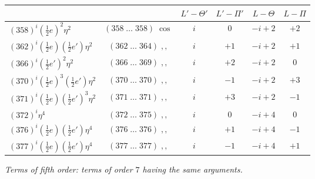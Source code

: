 \documentclass[11pt]{article}
\begin{document}
\begin{center}
\begin{tabular}{|l|c|c|c|c|c|}
\hline
 & & $L'-\Theta'$ & $L'-\Pi'$ & $L-\Theta$ & $L-\Pi$ \\
\hline
$(358)^i(\tfrac{1}{2}e)^2\eta^2$ & $(358\;\ldots\;358)\;\cos$ & $i$ & $0$ & $-i+2$ & $+2$ \\
$(362)^i(\tfrac{1}{2}e)(\tfrac{1}{2}e')\eta^2$ & $(362\;\ldots\;364)\;,,$ & $i$ & $+1$ & $-i+2$ & $+1$ \\
$(366)^i(\tfrac{1}{2}e')^2\eta^2$ & $(366\;\ldots\;369)\;,,$ & $i$ & $+2$ & $-i+2$ & $0$ \\
$(370)^i(\tfrac{1}{2}e)^3(\tfrac{1}{2}e')\eta^2$ & $(370\;\ldots\;370)\;,,$ & $i$ & $-1$ & $-i+2$ & $+3$ \\
$(371)^i(\tfrac{1}{2}e)(\tfrac{1}{2}e')^3\eta^2$ & $(371\;\ldots\;371)\;,,$ & $i$ & $+3$ & $-i+2$ & $-1$ \\
$(372)^i\eta^4$ & $(372\;\ldots\;375)\;,,$ & $i$ & $0$ & $-i+4$ & $0$ \\
$(376)^i(\tfrac{1}{2}e)(\tfrac{1}{2}e')\eta^4$ & $(376\;\ldots\;376)\;,,$ & $i$ & $+1$ & $-i+4$ & $-1$ \\
$(377)^i(\tfrac{1}{2}e)(\tfrac{1}{2}e')\eta^4$ & $(377\;\ldots\;377)\;,,$ & $i$ & $-1$ & $-i+4$ & $+1$ \\
\hline
\end{tabular}
\end{center}

\medskip

\textit{Terms of fifth order: terms of order $7$ having the same arguments.}

\smallskip
\end{document}
